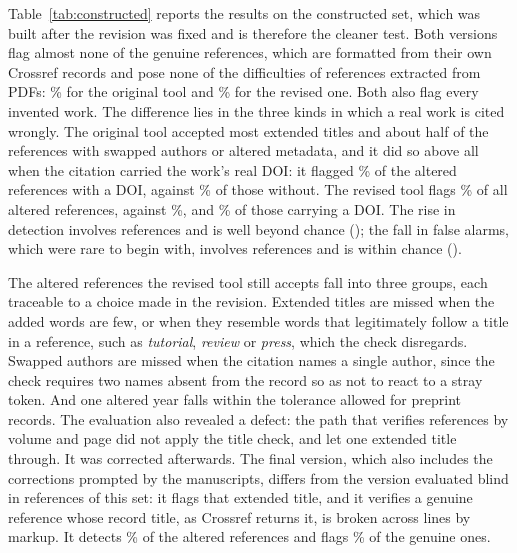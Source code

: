 \documentclass[pdflatex,sn-apa]{sn-jnl}
\begin{document}
Table~\ref{tab:constructed} reports the results on the constructed set, which was built after the revision was fixed and is therefore the cleaner test. Both versions flag almost none of the genuine references, which are formatted from their own Crossref records and pose none of the difficulties of references extracted from PDFs: \ConFARBase{}\% for the original tool and \ConFARRev{}\% for the revised one. Both also flag every invented work. The difference lies in the three kinds in which a real work is cited wrongly. The original tool accepted most extended titles and about half of the references with swapped authors or altered metadata, and it did so above all when the citation carried the work's real DOI: it flagged \ConDetBaseDOI{}\% of the altered references with a DOI, against \ConDetBaseNoDOI{}\% of those without. The revised tool flags \ConDetRev{}\% of all altered references, against \ConDetBase{}\%, and \ConDetRevDOI{}\% of those carrying a DOI. The rise in detection involves \TestConDetGained{} references and is well beyond chance (\TestConDetP{}); the fall in false alarms, which were rare to begin with, involves \TestConFARLost{} references and is within chance (\TestConFARP{}).

The altered references the revised tool still accepts fall into three groups, each traceable to a choice made in the revision. Extended titles are missed when the added words are few, or when they resemble words that legitimately follow a title in a reference, such as \emph{tutorial}, \emph{review} or \emph{press}, which the check disregards. Swapped authors are missed when the citation names a single author, since the check requires two names absent from the record so as not to react to a stray token. And one altered year falls within the tolerance allowed for preprint records. The evaluation also revealed a defect: the path that verifies references by volume and page did not apply the title check, and let one extended title through. It was corrected afterwards. The final version, which also includes the corrections prompted by the manuscripts, differs from the version evaluated blind in \ConFinalChanged{} references of this set: it flags that extended title, and it verifies a genuine reference whose record title, as Crossref returns it, is broken across lines by markup. It detects \ConDetRevFinal{}\% of the altered references and flags \ConFARRevFinal{}\% of the genuine ones.
\end{document}

